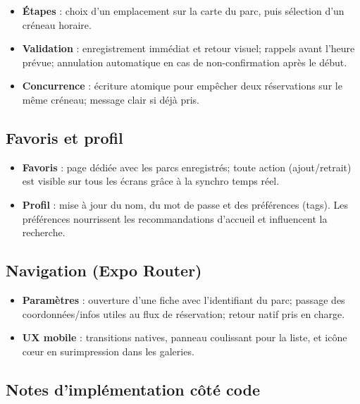 \documentclass[12pt,a4paper]{article}
\begin{document}
\begin{itemize}
  \item \textbf{Étapes} : choix d’un emplacement sur la carte du parc, puis sélection d’un créneau horaire.
  \item \textbf{Validation} : enregistrement immédiat et retour visuel; rappels avant l’heure prévue; annulation automatique en cas de non-confirmation après le début.
  \item \textbf{Concurrence} : écriture atomique pour empêcher deux réservations sur le même créneau; message clair si déjà pris.
\end{itemize}

\subsection{Favoris et profil}

\begin{itemize}
  \item \textbf{Favoris} : page dédiée avec les parcs enregistrés; toute action (ajout/retrait) est visible sur tous les écrans grâce à la synchro temps réel.
  \item \textbf{Profil} : mise à jour du nom, du mot de passe et des préférences (tags). Les préférences nourrissent les recommandations d’accueil et influencent la recherche.
\end{itemize}

\subsection{Navigation (Expo Router) }

\begin{itemize}
  \item \textbf{Paramètres} : ouverture d’une fiche avec l’identifiant du parc; passage des coordonnées/infos utiles au flux de réservation; retour natif pris en charge.
  \item \textbf{UX mobile} : transitions natives, panneau coulissant pour la liste, et icône cœur en surimpression dans les galeries.
\end{itemize}

\subsection{Notes d’implémentation côté code }
\end{document}
